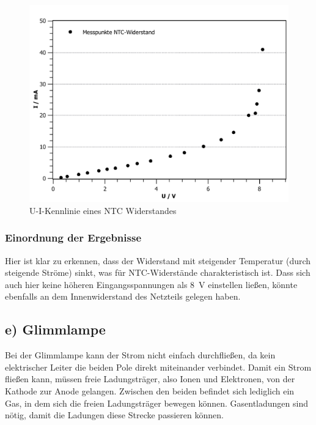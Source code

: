 \documentclass[11pt,a4paper,titlepage, ngerman]{article}
\begin{document}
				\begin{figure}[ht]
					\centering
					\includegraphics[width=\textwidth]{KennlinieNTCsubgitter_2.pdf}
					\caption{U-I-Kennlinie eines NTC Widerstandes}
					\label{KL d}
				\end{figure}
			
			\subsubsection*{Einordnung der Ergebnisse}
			
				Hier ist klar zu erkennen, dass der Widerstand mit steigender Temperatur (durch steigende Ströme) sinkt, was für NTC-Widerstände charakteristisch ist. 
				Dass sich auch hier keine höheren Eingangsspannungen als \SI{8}{\volt} einstellen ließen, könnte ebenfalls an dem Innenwiderstand des Netzteils gelegen haben.
			
		\subsection{e) Glimmlampe} 
			
			Bei der Glimmlampe kann der Strom nicht einfach durchfließen, da kein elektrischer Leiter die beiden Pole direkt miteinander verbindet.
			Damit ein Strom fließen kann, müssen freie Ladungsträger, also Ionen und Elektronen, von der Kathode zur Anode gelangen.
			Zwischen den beiden befindet sich lediglich ein Gas, in dem sich die freien Ladungsträger bewegen können. Gasentladungen sind nötig, damit die Ladungen diese Strecke passieren können.
			
\end{document}
